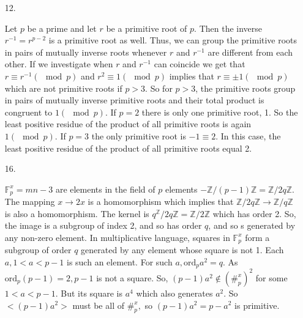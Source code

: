 \documentclass{article}
\theoremstyle{definition}
\newcommand{\Z}{\mathbb{Z}}
\begin{document}
\begin{enumerate}
    \item [12. ]
    
    Let $p$ be a prime and let $r$ be a primitive root of $p.$ Then the inverse $r^{-1} = r^{p-2}$ is a primitive root as well. Thus, we can group the primitive roots in pairs of mutually inverse roots whenever $r$ and $r^{-1}$ are different from each other. If we investigate when $r$ and $r^{-1}$ can coincide we get that $r\equiv r^{-1}(\mod p)$ and $r^2 \equiv 1 (\mod p)$ implies that $r\equiv \pm 1(\mod p)$ which are not primitive roots if $p > 3$. So for $p>3$, the primitive roots group in pairs of mutually inverse primitive roots and their total product is congruent to $1 (\mod p).$ If $p = 2$ there is only one primitive root, 1. So the least positive residue of the product of all primitive roots is again $1 (\mod p).$ If $p = 3$ the only primitive root is $-1 \equiv 2.$ In this case, the least positive residue of the product of all primitive roots equal 2.
    
    \item [16. ]
    
    $\mathbb{F}_p^x = mn-3$ are elements in the field of $p$ elements $- \Z/(p-1)\Z = \Z/2q\Z$. The mapping $x \rightarrow 2x$ is a homomorphism which implies that $\Z/2q\Z \rightarrow \Z/q\Z$ is also a homomorphism. The kernel is $q^\Z/2q\Z = \Z/2\Z$ which has order 2. So, the image is a subgroup of index 2, and so has order $q$, and so s generated by any non-zero element. In multiplicative language, squares in $\mathbb{F}^x_p$ form a subgroup of order $q$
     generated by any element whose square is not 1. Each $a, 1 < a < p-1$ is such an element. For such $a, \text{ord}_pa^2 = q.$ As $\text{ord}_p(p-1) = 2, p-1$ is not a square. So, $(p-1)a^2\not\in (\#_p^x)^2$ for some $1 < a < p-1$. But its square is $a^4$ which also generates $a^2$. So $<(p-1)a^2>$ must be all of $\#_p^x,$ so $(p-1)a^2 = p-a^2$ is primitive.
\end{enumerate}
\end{document}
